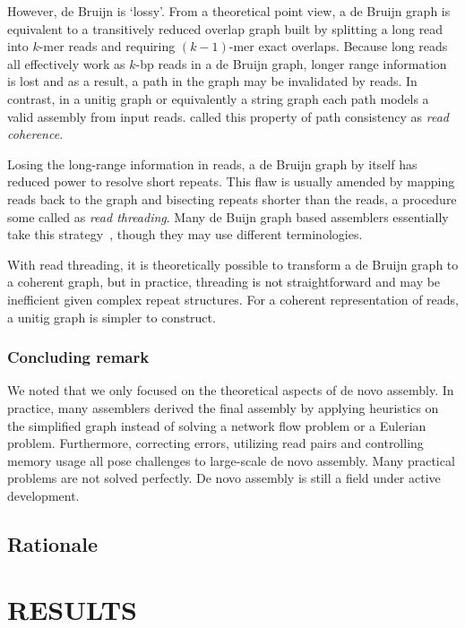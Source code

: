 \documentclass{bioinfo}
\begin{document}
\begin{methods}
However, de Bruijn is `lossy'. From a theoretical point view, a de Bruijn graph
is equivalent to a transitively reduced overlap graph built by splitting a long
read into $k$-mer reads and requiring $(k-1)$-mer exact overlaps. Because
long reads all effectively work as $k$-bp reads in a de Bruijn graph, longer
range information is lost and as a result, a path in the graph may be
invalidated by reads. In contrast, in a unitig graph or equivalently a string
graph each path models a valid assembly from input reads. \citet{Myers:2005bh}
called this property of path consistency as \emph{read coherence}.

Losing the long-range information in reads, a de Bruijn graph by itself has
reduced power to resolve short repeats. This flaw is usually amended by mapping
reads back to the graph and bisecting repeats shorter than the reads, a procedure
some called as \emph{read threading}. Many de Buijn graph based assemblers
essentially take this
strategy~\citep{Pevzner:2001vn,Chaisson:2009fk,Zerbino:2009ly,Li:2010vn},
though they may use different terminologies.

With read threading, it is theoretically possible to transform a de Bruijn graph
to a coherent graph, but in practice, threading is not straightforward and
may be inefficient given complex repeat structures. For a coherent representation
of reads, a unitig graph is simpler to construct.

\subsubsection{Concluding remark}
We noted that we only focused on the theoretical aspects of de novo assembly.
In practice, many assemblers derived the final assembly by applying heuristics
on the simplified graph instead of solving a network flow problem or a Eulerian
problem. Furthermore, correcting errors, utilizing read pairs and controlling memory
usage all pose challenges to large-scale de novo assembly. Many practical
problems are not solved perfectly. De novo assembly is still a field under
active development.

\subsection{Rationale}

\end{methods}

\section{RESULTS}
\end{document}
